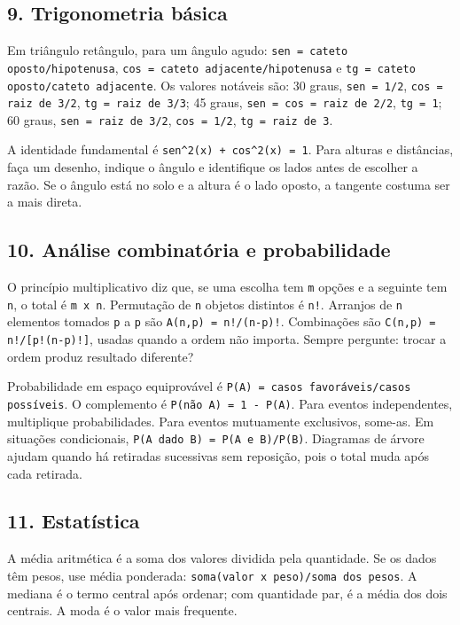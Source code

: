 \documentclass[11pt,a4paper]{article}
\begin{document}
\subsection*{9. Trigonometria básica}

Em triângulo retângulo, para um ângulo agudo: \texttt{sen = cateto oposto/hipotenusa}, \texttt{cos = cateto adjacente/hipotenusa} e \texttt{tg = cateto oposto/cateto adjacente}. Os valores notáveis são: 30 graus, \texttt{sen = 1/2}, \texttt{cos = raiz de 3/2}, \texttt{tg = raiz de 3/3}; 45 graus, \texttt{sen = cos = raiz de 2/2}, \texttt{tg = 1}; 60 graus, \texttt{sen = raiz de 3/2}, \texttt{cos = 1/2}, \texttt{tg = raiz de 3}.

A identidade fundamental é \texttt{sen\textasciicircum{}2(x) + cos\textasciicircum{}2(x) = 1}. Para alturas e distâncias, faça um desenho, indique o ângulo e identifique os lados antes de escolher a razão. Se o ângulo está no solo e a altura é o lado oposto, a tangente costuma ser a mais direta.

\subsection*{10. Análise combinatória e probabilidade}

O princípio multiplicativo diz que, se uma escolha tem \texttt{m} opções e a seguinte tem \texttt{n}, o total é \texttt{m x n}. Permutação de \texttt{n} objetos distintos é \texttt{n!}. Arranjos de \texttt{n} elementos tomados \texttt{p} a \texttt{p} são \texttt{A(n,p) = n!/(n-p)!}. Combinações são \texttt{C(n,p) = n!/[p!(n-p)!]}, usadas quando a ordem não importa. Sempre pergunte: trocar a ordem produz resultado diferente?

Probabilidade em espaço equiprovável é \texttt{P(A) = casos favoráveis/casos possíveis}. O complemento é \texttt{P(não A) = 1 - P(A)}. Para eventos independentes, multiplique probabilidades. Para eventos mutuamente exclusivos, some-as. Em situações condicionais, \texttt{P(A dado B) = P(A e B)/P(B)}. Diagramas de árvore ajudam quando há retiradas sucessivas sem reposição, pois o total muda após cada retirada.

\subsection*{11. Estatística}

A média aritmética é a soma dos valores dividida pela quantidade. Se os dados  têm pesos, use média ponderada: \texttt{soma(valor x peso)/soma dos pesos}. A mediana é o termo central após ordenar; com quantidade par, é a média dos dois centrais. A moda é o valor mais frequente.
\end{document}
